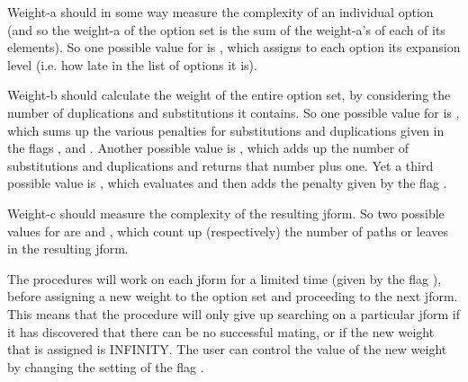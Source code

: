 Weight-a should in some way measure
the complexity of an individual option (and so the weight-a of the
option set is the sum of the weight-a's of each of its elements).
So one possible value for  is ,
which assigns to each option its expansion level (i.e. how late in the list of options
it is).

Weight-b should calculate the weight of the entire option set, by
considering the number of duplications and substitutions it contains.
So one possible value for  is ,
which sums up the  various penalties for substitutions and duplications given
in the flags , 
and . Another possible value is
, which adds up the number of substitutions and
duplications and returns that number plus one.
Yet a third possible value is , which evaluates
 and then adds the penalty given by the flag
.

Weight-c should measure the complexity of the resulting jform.
So two possible values for  are 
and , which count up (respectively) the number of paths
or leaves in the resulting jform.

The procedures will work on each jform for a limited time (given by the
flag ), before assigning a new weight to the option
set and proceeding to the next jform. This means that the procedure will only
give up searching on a particular jform if it has discovered that there can be no
successful mating, or if the new weight that is assigned is INFINITY.
The user can control the value of the new weight by changing the setting
of the flag .

